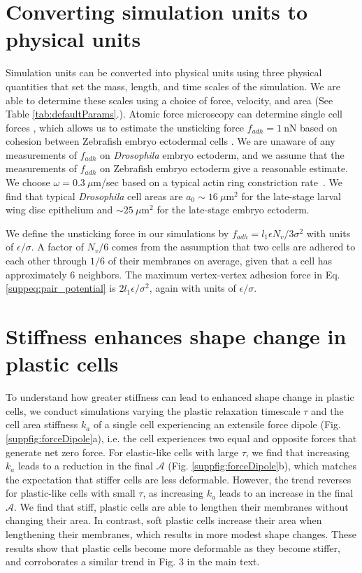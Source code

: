 \documentclass[%
 reprint,
superscriptaddress,
 amsmath,amssymb,
pre,
]{revtex4-2}
\begin{document}
\section{Converting simulation units to physical units}
Simulation units can be converted into physical units using three physical quantities that set the mass, length, and time scales of the simulation. We are able to determine these scales using a choice of force, velocity, and area (See Table \ref{tab:defaultParams}.). Atomic force microscopy can determine single cell forces \cite{kashef2015quantitative}, which allows us to estimate the unsticking force $f_{adh} = 1~$nN based on cohesion between Zebrafish embryo ectodermal cells \cite{krieg2008tensile}. We are unaware of any measurements of $f_{adh}$ on \textit{Drosophila} embryo ectoderm, and we assume that the measurements of $f_{adh}$ on Zebrafish embryo ectoderm give a reasonable estimate. We choose $\omega = 0.3~\mu $m/sec based on a typical actin ring constriction rate~\cite{biron2005molecular, stachowiak2014mechanism}. We find that typical \textit{Drosophila} cell areas are $a_0 \sim 16~\mu$m$^2$ for the late-stage larval wing disc epithelium and $\sim 25~\mu$m$^2$ for the late-stage embryo ectoderm.

We define the unsticking force in our simulations by $f_{adh}=l_1\epsilon N_v/3\sigma^2$ with units of $\epsilon/\sigma$. A factor of $N_v/6$ comes from the assumption that two cells are adhered to each other through $1/6$ of their membranes on average, given that a cell has approximately $6$ neighbors. The maximum vertex-vertex adhesion force in Eq. \ref{suppeq:pair_potential} is $2l_1\epsilon/\sigma^2$, again with units of $\epsilon/\sigma$.  

\section{Stiffness enhances shape change in plastic cells}
To understand how greater stiffness can lead to enhanced shape change in plastic cells, we conduct simulations varying the plastic relaxation timescale $\tau$ and the cell area stiffness $k_a$ of a single cell experiencing an extensile force dipole (Fig. \ref{suppfig:forceDipole}a), i.e. the cell experiences two equal and opposite forces that generate net zero force. For elastic-like cells with large $\tau$, we find that increasing $k_a$ leads to a reduction in the final $\mathcal{A}$ (Fig. \ref{suppfig:forceDipole}b), which matches the expectation that stiffer cells are less deformable. However, the trend reverses for plastic-like cells with small $\tau$, as increasing $k_a$ leads to an increase in the final $\mathcal{A}$. We find that stiff, plastic cells are able to lengthen their membranes without changing their area. In contrast, soft plastic cells increase their area when lengthening their membranes, which results in more modest shape changes. These results show that plastic cells become more deformable as they become stiffer, and corroborates a similar trend in Fig. 3 in the main text. 
\end{document}
